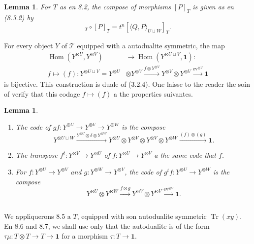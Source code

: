 \documentclass[11pt,a4paper]{article}
\theoremstyle{plain}
\newtheorem{lemma}[theorem]{Lemma}
\theoremstyle{definition}
\DeclareMathOperator{\Hom}{Hom}
\DeclareMathOperator{\Tr}{Tr}
\newcommand{\ev}{\mathrm{ev}}
\begin{document}
\begin{lemma}
For $T$ as en 8.2, the compose of morphisms $[P]_T$ is given as en (8.3.2) by
\begin{equation}
[Q]_T \circ [P]_T = t^n [\langle Q, P \rangle_{U \sqcup W}]_T. \tag{8.4.1}
\end{equation}
\end{lemma}

For every object $Y$ of $\mathcal{T}$ equipped with a autodualite symmetric, the map
\begin{align*}
\Hom(Y^{\otimes U}, Y^{\otimes V}) &\to \Hom(Y^{\otimes U \sqcup V}, \mathbf{1}) : \\
f \longmapsto (f) : Y^{\otimes U \sqcup V} = Y^{\otimes U} &\otimes Y^{\otimes V} \xrightarrow{f \otimes Y^{\otimes V}} Y^{\otimes V} \otimes Y^{\otimes V} \xrightarrow{\ev^{\otimes V}} \mathbf{1}
\end{align*}
is bijective. This construction is duale of (3.2.4). One laisse to the reader the soin of verify that this codage $f \mapsto (f)$ a the properties suivantes.

\begin{lemma}
\begin{enumerate}[label=(\roman*)]
\item The code of $gf : Y^{\otimes U} \to Y^{\otimes V} \to Y^{\otimes W}$ is the compose
\[
Y^{\otimes U \sqcup W} \xrightarrow{Y^{\otimes U} \otimes \delta \otimes Y^{\otimes W}} Y^{\otimes U} \otimes Y^{\otimes V} \otimes Y^{\otimes V} \otimes Y^{\otimes W} \xrightarrow{(f) \otimes (g)} \mathbf{1}.
\]
\item The transpose $f^t : Y^{\otimes V} \to Y^{\otimes U}$ of $f : Y^{\otimes U} \to Y^{\otimes V}$ a the same code that $f$.
\item For $f : Y^{\otimes U} \to Y^{\otimes V}$ and $g : Y^{\otimes W} \to Y^{\otimes V}$, the code of $g^t f : Y^{\otimes U} \to Y^{\otimes W}$ is the compose
\[
Y^{\otimes U} \otimes Y^{\otimes W} \xrightarrow{f \otimes g} Y^{\otimes V} \otimes Y^{\otimes V} \xrightarrow{\ev^{\otimes V}} \mathbf{1}.
\]
\end{enumerate}
\end{lemma}

\subsection{}
We appliquerons 8.5 a $T$, equipped with son autodualite symmetric $\Tr(xy)$. En 8.6 and 8.7, we shall use only that the autodualite is of the form $\tau \mu : T \otimes T \to T \to \mathbf{1}$ for a morphism $\tau : T \to \mathbf{1}$.
\end{document}
